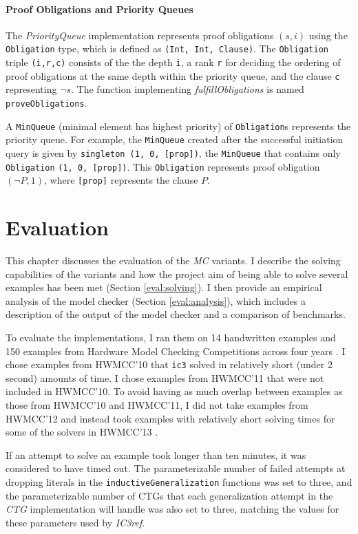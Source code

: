 \documentclass[12pt,a4paper,twoside,openright]{report}
\begin{document}
{{\subsubsection{Proof Obligations and Priority Queues}

The {\it PriorityQueue} implementation represents proof obligations $(s,i)$ using the
\verb,Obligation, type, which is defined as \verb.(Int, Int, Clause)..
The \verb,Obligation, triple
\verb.(i,r,c). consists of the the depth \verb,i,, a
rank \verb,r, for deciding the ordering of proof obligations at the same depth within the priority
queue, and the clause \verb,c, representing $\neg s$. The
function implementing {\it fulfillObligations} is named \verb,proveObligations,.

A \verb,MinQueue, (minimal element has highest priority) of \verb,Obligation,s
represents the priority queue.
For example, the \verb,MinQueue, created after the successful initiation query
is given by \verb.singleton (1, 0, [prop])., the \verb,MinQueue, that
contains only \verb,Obligation, \verb.(1, 0, [prop]).. This \verb,Obligation, represents proof obligation
$(\neg P,1)$, where \verb,[prop], represents the clause $P$.

\chapter{Evaluation}
\label{eval}

This chapter discusses the evaluation of the \emph{MC} variants.
I describe the solving capabilities of the variants
and how the project aim of being able to solve several examples has been met
(Section \ref{eval:solving}). I then provide an empirical analysis of the
model checker (Section \ref{eval:analysis}), which includes a description of
the output of the model checker and a comparison of benchmarks.

To evaluate the implementations, I ran them
on 14 handwritten examples and 150 examples from
Hardware Model Checking Competitions across four years \cite{hwmcc10, hwmcc11, hwmcc13}.
I chose examples from HWMCC'10 that \verb,ic3, solved in relatively short
(under 2 second) amounts of time. I chose examples from HWMCC'11 that were
not included in HWMCC'10.
To avoid having as much overlap between examples as those from HWMCC'10 and HWMCC'11,
I did not take examples from HWMCC'12 and instead took examples
with relatively short solving times for some of the solvers in HWMCC'13
\cite{hwmcc13}.

If an attempt to solve an example took longer than ten minutes, it was considered to have timed out.
The parameterizable number of failed attempts
at dropping literals in the \verb,inductiveGeneralization, functions was set to
three, and the parameterizable number of CTGs that each generalization attempt
in the {\it CTG} implementation will handle was also set to three, matching the
values for these parameters used by \emph{IC3ref}.

}}
\end{document}
